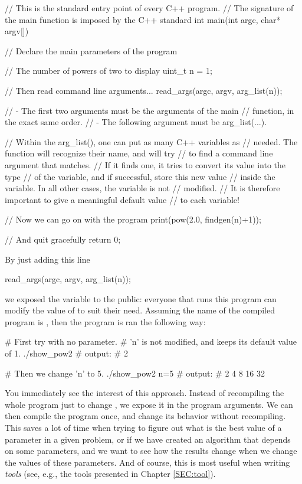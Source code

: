 \begin{example}
\begin{cppcode}
// This is the standard entry point of every C++ program.
// The signature of the main function is imposed by the C++ standard
int main(int argc, char* argv[]) {
    // Declare the main parameters of the program

    // The number of powers of two to display
    uint_t n = 1;

    // Then read command line arguments...
    read_args(argc, argv, arg_list(n));

    // - The first two arguments must be the arguments of the main
    //   function, in the exact same order.
    // - The following argument must be arg_list(...).

    // Within the arg_list(), one can put as many C++ variables as
    // needed. The function will recognize their name, and will try
    // to find a command line argument that matches.
    // If it finds one, it tries to convert its value into the type
    // of the variable, and if successful, store this new value
    // inside the variable. In all other cases, the variable is not
    // modified.
    // It is therefore important to give a meaningful default value
    // to each variable!

    // Now we can go on with the program
    print(pow(2.0, findgen(n)+1));

    // And quit gracefully
    return 0;
}
\end{cppcode}
\end{example}

By just adding this line
\begin{cppcode}
    read_args(argc, argv, arg_list(n));
\end{cppcode}
we exposed the variable  to the public: everyone that runs this program can modify the value of  to suit their need. Assuming the name of the compiled program is , then the program is ran the following way:

\begin{bashcode}
# First try with no parameter.
# 'n' is not modified, and keeps its default value of 1.
./show_pow2
# output:
# 2

# Then we change 'n' to 5.
./show_pow2 n=5
# output:
# 2 4 8 16 32
\end{bashcode}

You immediately see the interest of this approach. Instead of recompiling the whole program just to change , we expose it in the program arguments. We can then compile the program once, and change its behavior without recompiling. This saves a lot of time when trying to figure out what is the best value of a parameter in a given problem, or if we have created an algorithm that depends on some parameters, and we want to see how the results change when we change the values of these parameters. And of course, this is most useful when writing \emph{tools} (see, e.g., the tools presented in Chapter \ref{SEC:tool}).


